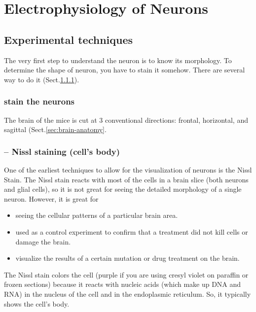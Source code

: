 \chapter{Electrophysiology of Neurons}

\section{Experimental techniques}

The very first step to understand the neuron is to know its morphology.
To determine the shape of neuron, you have to stain it somehow.  There are
several way to do it (Sect.\ref{sec:stain-neuron}).



\subsection{stain the neurons}
\label{sec:stain-neuron}

The brain of the mice is cut at 3 conventional directions: frontal, horizontal,
and sagittal (Sect.\ref{sec:brain-anatomy}.


\subsection{-- Nissl staining (cell's body)}
\label{sec:Nissl-stain}

One of the earliest techniques to allow for the visualization of neurons is the
Nissl Stain.
The Nissl stain reacts with most of the cells in a brain slice (both neurons and
glial cells), so it is not great for seeing the detailed morphology of a single neuron.
However, it is great for 
\begin{itemize}
  \item  seeing the cellular patterns of a particular brain
area. 

  \item used as a control experiment to confirm that a treatment did not kill
  cells or damage the brain.  
  
  \item  visualize the results of a certain mutation or drug treatment on the
  brain. 
\end{itemize}


The Nissl stain colors the cell (purple if you are using cresyl violet on
paraffin or frozen sections) because it reacts with nucleic acids (which make up
DNA and RNA) in the nucleus of the cell and in the endoplasmic reticulum. So, it
typically shows the cell's body.


